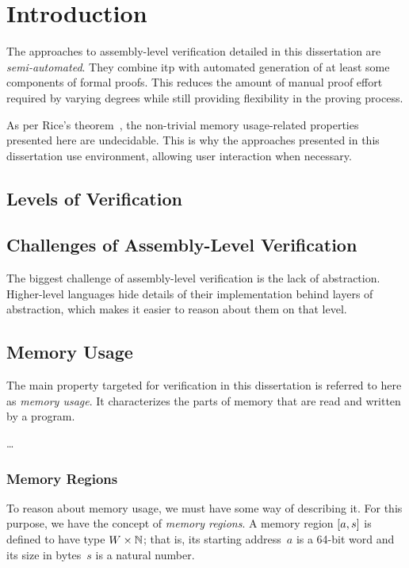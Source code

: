 \chapter{Introduction}

The approaches to assembly-level verification detailed in this dissertation%
are \emph{semi-automated}.
They combine \ac{itp} with automated generation
of at least some components of formal proofs.
This reduces the amount of manual proof effort required by varying degrees
while still providing flexibility in the proving process.


As per Rice's theorem~\citep{rice1953classes},
the non-trivial memory usage-related properties presented here are undecidable.
This is why the approaches presented in this dissertation
use  environment, allowing user interaction when necessary.

\section{Levels of Verification}

\section{Challenges of Assembly-Level Verification}
The biggest challenge of assembly-level verification is the lack of abstraction.
Higher-level languages hide details of their implementation
behind layers of abstraction, which makes it easier to reason about them
on that level.

\section{Memory Usage}\label{memory_usage}
The main property targeted for verification in this dissertation
is referred to here as \emph{memory usage}.%
It characterizes the parts of memory that are read and written by a program.


\todo\dots



\subsection{Memory Regions}\label{memory_regions}
To reason about memory usage, we must have some way of describing it.
For this purpose, we have the concept of \emph{memory regions}.%
A memory region $[a,s]$ is defined to have type $W\times\mathbb{N}$;%
%
that is, its starting address~$a$ is a 64-bit word
and its size in bytes~$s$ is a natural number.

